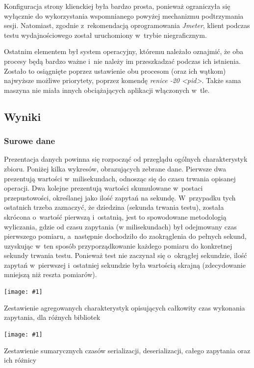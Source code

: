 \documentclass[12pt]{article}
\newcommand{\n}{\newline}
\newcommand{\putfig}[3]{
\begin{captioned}[H]
	\centering
	\texttt{[image: \#1]}
	\caption{#2}
	\label{#3}
	\medskip
\end{captioned}
}
\newcommand{\nonpl}[1]{{\it #1}}
\newcommand{\code}[1]{{\it #1}}
\newcommand{\Jmeter}{\nonpl{Jmeter}\texttrademark}
\begin{document}
{{{				Konfiguracja strony klienckiej była bardzo prosta, ponieważ ograniczyła się wyłącznie do wykorzystania wspomnianego powyżej mechanizmu podtrzymania sesji. Natomiast,
				zgodnie z~rekomendacją oprogramowania \Jmeter, klient podczas testu wydajnościowego został uruchomiony w~trybie niegraficznym.\n

				Ostatnim elementem był system operacyjny, któremu należało oznajmić, że oba procesy będą bardzo ważne i~nie należy im przeszkadzać podczas ich istnienia. Zostało to
				osiągnięte poprzez ustawienie obu procesom (oraz ich wątkom) najwyższe możliwe priorytety, poprzez komendę \code{renice -20 <pid>}.
				Także sama maszyna nie miała innych obciążających aplikacji włączonych w~tle.
			}
		}

		{
			\subsection{Wyniki}

			{
				\subsubsection{Surowe dane}

				Prezentacja danych powinna się rozpocząć od przeglądu ogólnych charakterystyk zbioru. Poniżej kilka wykresów, obrazujących zebrane dane.
				Pierwsze dwa prezentują wartości w~milisekundach, odnosząc się do czasu trwania opisanej operacji. Dwa kolejne prezentują wartości skumulowane
				w~postaci przepustowości, określanej jako ilość zapytań na sekundę. W~przypadku tych ostatnich trzeba zaznaczyć, że dziedzina (sekunda trwania testu),
				została skrócona o~wartość pierwszą i~ostatnią, jest to spowodowane metodologią wyliczania, gdzie od czasu zapytania (w milisekundach) był odejmowany
				czas pierwszego pomiaru, a~następnie dochodziło do zaokrąglenia do pełnych sekund, uzyskując w~ten sposób przyporządkowanie każdego pomiaru do konkretnej sekundy trwania testu.
				Ponieważ test nie zaczynał się o~okrągłej sekundzie, ilość zapytań w~pierwszej i~ostatniej sekundzie była wartością skrajną (zdecydowanie mniejszą niż reszta pomiarów).

				{
					\putfig{./charts/pre_generated_charts/total_request_time_per_library_summary.png}{
						Zestawienie agregowanych charakterystyk opisujących całkowity czas wykonania zapytania, dla różnych bibliotek
					}{sumfig_1}
				}

				{
					\putfig{./charts/pre_generated_charts/total_serial_and_deserial_library_summmary.png}{
						Zestawienie sumarycznych czasów serializacji, deserializacji, całego zapytania oraz ich różnicy
					}{sumfig_2}
				}

}}}
\end{document}
